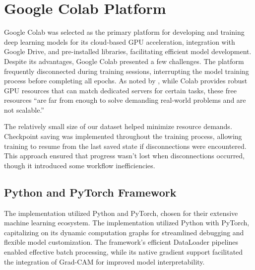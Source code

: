 \documentclass[a4paper,12pt]{report}
\begin{document}
\section{Google Colab Platform}

Google Colab was selected as the primary platform for developing and training deep learning models for its cloud-based GPU acceleration, integration with Google Drive, and pre-installed libraries, facilitating efficient model development. Despite its advantages, Google Colab presented a few challenges. The platform frequently disconnected during training sessions, interrupting the model training process before completing all epochs. As noted by \citep{carneiro2018}, while Colab provides robust GPU resources that can match dedicated servers for certain tasks, these free resources ``are far from enough to solve demanding real-world problems and are not scalable.''

The relatively small size of our dataset helped minimize resource demands. Checkpoint saving was implemented throughout the training process, allowing training to resume from the last saved state if disconnections were encountered. This approach ensured that progress wasn't lost when disconnections occurred, though it introduced some workflow inefficiencies.

\subsection{Python and PyTorch Framework}

The implementation utilized Python and PyTorch, chosen for their extensive machine learning ecosystem. The implementation utilized Python with PyTorch, capitalizing on its dynamic computation graphs for streamlined debugging and flexible model customization. The framework's efficient DataLoader pipelines enabled effective batch processing, while its native gradient support facilitated the integration of Grad-CAM for improved model interpretability.


\end{document}
